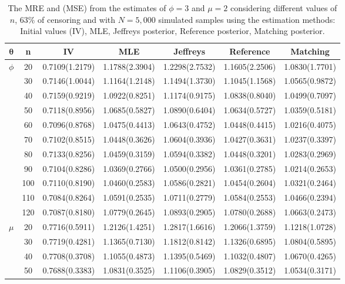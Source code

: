 \begin{table}[!h]
\centering
\caption{The MRE and (MSE) from the estimates of $\phi=3$ and $\mu=2$ considering different values of $n$, $63\%$ of censoring and with $N=5,000$ simulated samples using the estimation methods: Initial values (IV),  MLE, Jeffreys posterior, Reference posterior,  Matching posterior.}
{\small
\begin{tabular}{c|c|c|c|c|c|c}
\hline
$\boldsymbol{\theta}$ & n & IV & MLE & Jeffreys  & Reference  & Matching  \\
\hline
\multirow{11}{*}{$\phi$} 
&  20 & 0.7109(1.2179) & 1.1788(2.3904) & 1.2298(2.7532) & 1.1605(2.2506) & 1.0830(1.7701) \\
&  30 & 0.7146(1.0044) & 1.1164(1.2148) & 1.1494(1.3730) & 1.1045(1.1568) & 1.0565(0.9872) \\
&  40 & 0.7159(0.9219) & 1.0922(0.8251) & 1.1174(0.9175) & 1.0838(0.8040) & 1.0499(0.7097) \\
&  50 & 0.7118(0.8956) & 1.0685(0.5827) & 1.0890(0.6404) & 1.0634(0.5727) & 1.0359(0.5181) \\
&  60 & 0.7096(0.8768) & 1.0475(0.4413) & 1.0643(0.4752) & 1.0448(0.4415) & 1.0216(0.4075) \\
&  70 & 0.7102(0.8515) & 1.0448(0.3626) & 1.0604(0.3936) & 1.0427(0.3631) & 1.0237(0.3397) \\
&  80 & 0.7133(0.8256) & 1.0459(0.3159) & 1.0594(0.3382) & 1.0448(0.3201) & 1.0283(0.2969) \\
&  90 & 0.7104(0.8286) & 1.0369(0.2766) & 1.0500(0.2956) & 1.0361(0.2785) & 1.0214(0.2653) \\
&  100 & 0.7110(0.8190) & 1.0460(0.2583) & 1.0586(0.2821) & 1.0454(0.2604) & 1.0321(0.2464) \\
&  110 & 0.7084(0.8264) & 1.0591(0.2535) & 1.0711(0.2779) & 1.0584(0.2553) & 1.0466(0.2394) \\
&  120 & 0.7087(0.8180) & 1.0779(0.2645) & 1.0893(0.2905) & 1.0780(0.2688) & 1.0663(0.2473) \\
\hline
\multirow{11}{*}{$\mu$} 
&  20 & 0.7716(0.5911) & 1.2126(1.4251) & 1.2817(1.6616) & 1.2066(1.3759) & 1.1218(1.0728) \\
&  30 & 0.7719(0.4281) & 1.1365(0.7130) & 1.1812(0.8142) & 1.1326(0.6895) & 1.0804(0.5895) \\
&  40 & 0.7708(0.3708) & 1.1055(0.4873) & 1.1395(0.5469) & 1.1032(0.4807) & 1.0670(0.4265) \\
&  50 & 0.7688(0.3383) & 1.0831(0.3525) & 1.1106(0.3905) & 1.0829(0.3512) & 1.0534(0.3171) \\

\end{tabular}}
\end{table}
